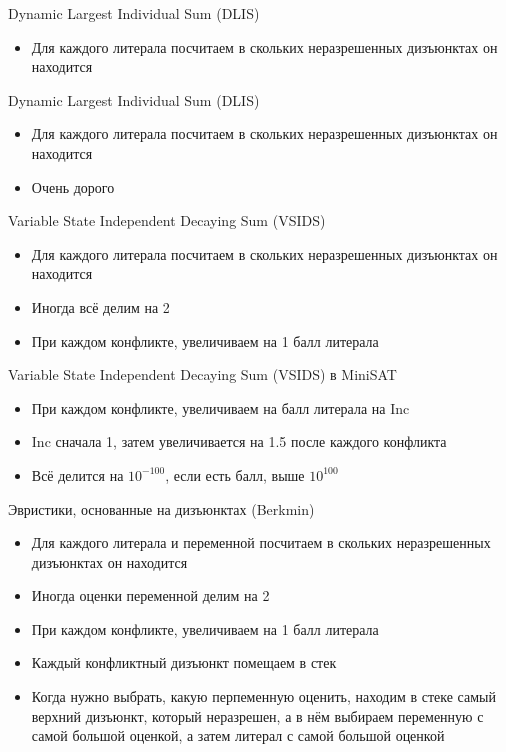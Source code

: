 \documentclass{beamer}
\begin{document}
\begin{frame}{Dynamic Largest Individual Sum (DLIS)}
\begin{itemize}
\item Для каждого литерала посчитаем в скольких неразрешенных дизъюнктах он находится
\end{itemize}
\end{frame}

\begin{frame}{Dynamic Largest Individual Sum (DLIS)}
\begin{itemize}
\item Для каждого литерала посчитаем в скольких неразрешенных дизъюнктах он находится
\item Очень дорого
\end{itemize}
\end{frame}

\begin{frame}{Variable State Independent Decaying Sum (VSIDS)}
\begin{itemize}
\item Для каждого литерала посчитаем в скольких неразрешенных дизъюнктах он находится
\item Иногда всё делим на 2
\item При каждом конфликте, увеличиваем на 1 балл литерала
\end{itemize}
\end{frame}

\begin{frame}{Variable State Independent Decaying Sum (VSIDS) в MiniSAT}
\begin{itemize}
\item При каждом конфликте, увеличиваем на балл литерала на Inc
\item Inc сначала 1, затем увеличивается на 1.5 после каждого конфликта
\item Всё делится на $10^{-100}$, если есть балл, выше $10^{100}$
\end{itemize}
\end{frame}

\begin{frame}{Эвристики, основанные на дизъюнктах (Berkmin)}
\begin{itemize}
\item Для каждого литерала и переменной посчитаем в скольких неразрешенных дизъюнктах он находится
\item Иногда оценки переменной делим на 2
\item При каждом конфликте, увеличиваем на 1 балл литерала
\item Каждый конфликтный дизъюнкт помещаем в стек
\item Когда нужно выбрать, какую перпеменную оценить, находим в стеке самый верхний дизъюнкт, который неразрешен, а в нём
выбираем переменную с самой большой оценкой, а затем литерал с самой большой оценкой
\end{itemize}
\end{frame}
\end{document}
